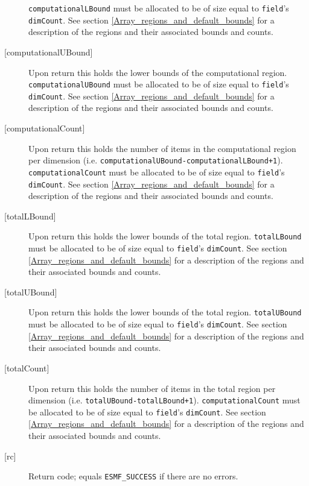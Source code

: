 \begin{description}
\begin{sloppypar}
   {\tt computationalLBound} must be allocated to be of size equal to {\tt field}'s {\tt dimCount}. 
   See section \ref{Array_regions_and_default_bounds} for a description 
   of the regions and their associated bounds and counts. 
   \end{sloppypar} 
   \item[{[computationalUBound]}] 
   \begin{sloppypar} 
   Upon return this holds the lower bounds of the computational region. 
   {\tt computationalUBound} must be allocated to be of size equal to {\tt field}'s {\tt dimCount}. 
   See section \ref{Array_regions_and_default_bounds} for a description 
   of the regions and their associated bounds and counts. 
   \end{sloppypar} 
   \item[{[computationalCount]}] 
   Upon return this holds the number of items in the computational region per dimension 
   (i.e. {\tt computationalUBound-computationalLBound+1}). {\tt computationalCount} must 
   be allocated to be of size equal to {\tt field}'s {\tt dimCount}. 
   See section \ref{Array_regions_and_default_bounds} for a description 
   of the regions and their associated bounds and counts. 
   \item[{[totalLBound]}] 
   Upon return this holds the lower bounds of the total region. 
   {\tt totalLBound} must be allocated to be of size equal to {\tt field}'s {\tt dimCount}. 
   See section \ref{Array_regions_and_default_bounds} for a description 
   of the regions and their associated bounds and counts. 
   \item[{[totalUBound]}] 
   Upon return this holds the lower bounds of the total region. 
   {\tt totalUBound} must be allocated to be of size equal to {\tt field}'s {\tt dimCount}. 
   See section \ref{Array_regions_and_default_bounds} for a description 
   of the regions and their associated bounds and counts. 
   \item[{[totalCount]}] 
   \begin{sloppypar} 
   Upon return this holds the number of items in the total region per dimension 
   (i.e. {\tt totalUBound-totalLBound+1}). {\tt computationalCount} must 
   be allocated to be of size equal to {\tt field}'s {\tt dimCount}. 
   See section \ref{Array_regions_and_default_bounds} for a description 
   of the regions and their associated bounds and counts. 
   \end{sloppypar} 
   \item [{[rc]}] 
   Return code; equals {\tt ESMF\_SUCCESS} if there are no errors. 
   \end{description} 
    
